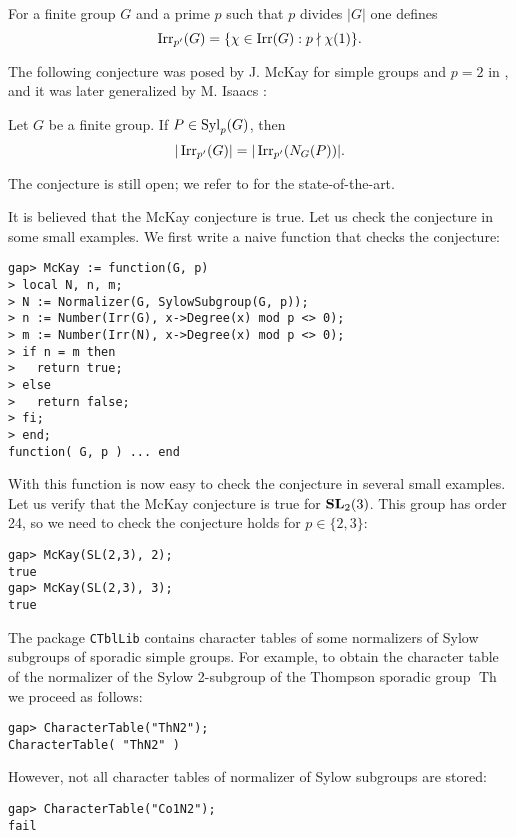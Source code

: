 For a finite group $G$ and a prime $p$ such that $p$ divides $|G|$ one defines
\[
	\operatorname{Irr}_{p'}(G)=\{\chi\in\operatorname{Irr}(G):p\nmid\chi(1)\}.
\]

The following conjecture was posed by J. McKay for simple 
groups and $p=2$ in \cite{McKayNoticesAMS}, and
it was later generalized by M. Isaacs \cite{MR332945}: 

\begin{conjecture}[McKay]
\label{conj:McKay}
Let $G$ be a finite group. If $P\in\mathrm{Syl}_p(G)$,
then 
  \[
	|\operatorname{Irr}_{p'}(G)|=|\operatorname{Irr}_{p'}(N_G(P))|.
  \]
\end{conjecture}

The conjecture is still open; we refer to 
\cite{MR3753712} for the state-of-the-art. 

\begin{example}
\label{exa:McKay}
It is believed that the McKay conjecture is true.  Let us check the conjecture
in some small examples. We first write a naive 
function that checks the conjecture:
\begin{lstlisting}
gap> McKay := function(G, p)
> local N, n, m;
> N := Normalizer(G, SylowSubgroup(G, p));
> n := Number(Irr(G), x->Degree(x) mod p <> 0);
> m := Number(Irr(N), x->Degree(x) mod p <> 0);
> if n = m then
>   return true;
> else
>   return false;
> fi;
> end;
function( G, p ) ... end
\end{lstlisting}
With this function is now easy to check the conjecture in several small
examples. Let us verify that the McKay conjecture is true for $\mathbf{SL}_2(3)$. This
group has order 24, so we need to check the conjecture holds for $p\in\{2,3\}$:
\begin{lstlisting}
gap> McKay(SL(2,3), 2);
true
gap> McKay(SL(2,3), 3);
true
\end{lstlisting}

The package \lstinline{CTblLib} 
contains character tables of some normalizers of Sylow subgroups
of sporadic simple groups. 
For example, to obtain the character table of the 
normalizer of the Sylow 2-subgroup of the Thompson sporadic group $\operatorname{Th}$ 
we proceed as follows:
\begin{lstlisting}
gap> CharacterTable("ThN2");
CharacterTable( "ThN2" ) 
\end{lstlisting}
However, not all character tables of normalizer of Sylow subgroups are stored:
\begin{lstlisting}
gap> CharacterTable("Co1N2");
fail
\end{lstlisting}


\end{example}
